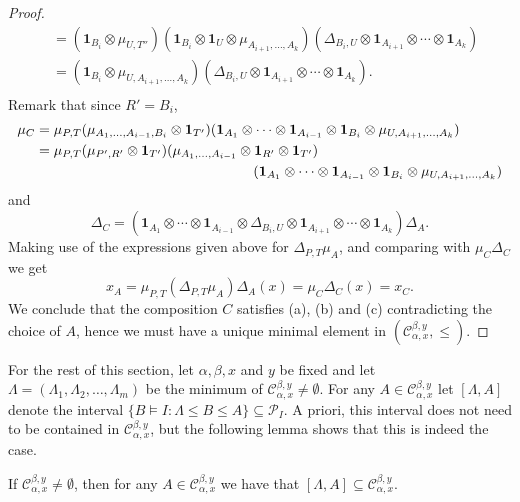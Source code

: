 \documentclass[ALCO,ThmDefs,Unicode,epreuves]{cedram}
\def\Id{\mathbf{1}}
\begin{document}
\begin{proof}
$$\begin{aligned}
 &=(\Id_{B_i}\otimes \mu_{U,T''})(\Id_{B_i}\otimes \Id_U\otimes \mu_{A_{i+1},\ldots,A_k})(\Delta_{B_i,U}\otimes\Id_{A_{i+1}}
 \otimes\cdots\otimes \Id_{A_k})\\
 &=(\Id_{B_i}\otimes \mu_{U,A_{i+1},\ldots,A_k})(\Delta_{B_i,U}\otimes\Id_{A_{i+1}} \otimes\cdots\otimes \Id_{A_k}).\\
 \end{aligned}
 $$
Remark that since $R'=B_i$,
 $$
 \begin{aligned}
 \mu_C&=\mu_{P,T}(\mu_{A_1,\ldots,A_{i-1},B_i}\otimes \Id_{T'})(\Id_{A_{1}} \otimes\cdots\otimes \Id_{A_{i-1}}\otimes\Id_{B_i}\otimes \mu_{U,A_{i+1},\ldots,A_k})\\
 &=\mu_{P,T}(\mu_{P',R'}\otimes \Id_{T'})(\mu_{A_1,\ldots,A_{i-1}}\otimes\Id_{R'}\otimes\Id_{T'})
\\ 
&\hspace*{55mm} (\Id_{A_{1}} \otimes\cdots\otimes \Id_{A_{i-1}}\otimes\Id_{B_i}\otimes \mu_{U,A_{i+1},\ldots,A_k})\\
 \end{aligned}
 $$
 and 
 $$\Delta_C=(\Id_{A_{1}} \otimes\cdots\otimes \Id_{A_{i-1}}\otimes\Delta_{B_i,U}\otimes\Id_{A_{i+1}} \otimes\cdots\otimes \Id_{A_k})\Delta_A.$$
 Making use of the expressions given above for $\Delta_{P,T}\mu_A$, and comparing with $\mu_C\Delta_C$ we get
 $$x_A=\mu_{P,T}(\Delta_{P,T}\mu_A)\Delta_A(x)=\mu_C\Delta_C(x)=x_C.$$
We conclude that the composition $C$ satisfies (a), (b) and (c) contradicting the choice of $A$, hence we must have a unique minimal element in $(\mathcal{C}_{\alpha,x}^{\beta,y},\le)$.
\end{proof}

For the rest of this section, let $\alpha,\beta,x$ and $y$ be fixed and let $\Lambda=(\Lambda_1,\Lambda_2,\ldots,\Lambda_m)$ be the minimum of $\mathcal{C}_{\alpha,x}^{\beta,y}\ne \emptyset$.
For any $A\in\mathcal{C}_{\alpha,x}^{\beta,y}$ let $[\Lambda,A]$ denote the interval $\big\{ B\models I : \Lambda\le B\le A\big\}\subseteq \mathcal{P}_I$. A priori, this interval does not need to be contained in $\mathcal{C}_{\alpha,x}^{\beta,y}$, but the following lemma shows that this is indeed the case.

\begin{lemma}\label{le:lowerideal}
If $\mathcal{C}_{\alpha,x}^{\beta,y}\ne\emptyset$, then for any $A\in\mathcal{C}_{\alpha,x}^{\beta,y}$ we have that 
$[\Lambda,A]\subseteq \mathcal{C}_{\alpha,x}^{\beta,y}$.
\end{lemma}
\end{document}
